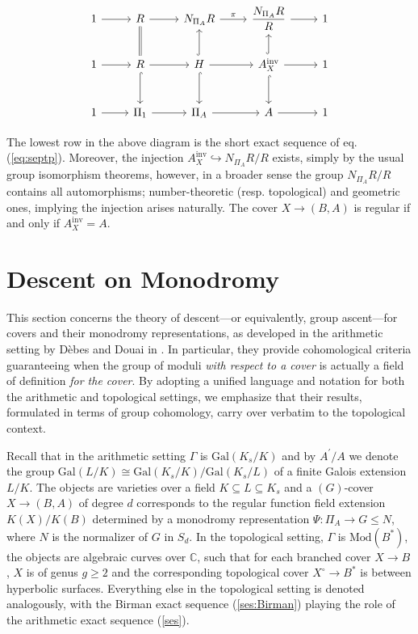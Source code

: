 \documentclass[10pt]{amsart}
\theoremstyle{definition}
\newcommand{\Gal}{{ \mathrm{Gal}}}
\begin{document}
\begin{equation}
\label{eq:defH-R}
\begin{tikzcd}[column sep=normal,row sep=normal]
1 \ar[r] & R \ar[r] & N_{\Pi_A}R \ar[r,"\pi"] & \dfrac{N_{\Pi_A}R}{R} \ar[r] & 1 \\
1 \ar[r] & R \ar[u, equal] \ar[r] \ar[hookrightarrow,d] & H \ar[r] \ar[hookrightarrow,u] \ar[hookrightarrow,d] & A_X^{\mathrm{inv}} \ar[r] \ar[hookrightarrow,u] \ar[hookrightarrow,d] & 1 \\[7.5pt]
1 \ar[r] & \Pi_1 \ar[r] & \Pi_A \ar[r] & A \ar[r] & 1
\end{tikzcd}
\end{equation}


The lowest row in the above diagram is the short exact sequence of eq. (\ref{eq:septp}). 
Moreover, the injection $A_X^{\mathrm{inv}} \hookrightarrow N_{\Pi_A}R/R$ exists, simply by the usual group isomorphism theorems, however, in a broader sense the group $N_{\Pi_A}R/R$ contains all automorphisms; number-theoretic (resp. topological) and geometric ones, implying the injection arises naturally.  The cover $X\rightarrow (B,A)$ is regular if and only if $A_X^{\mathrm{inv}} = A$.




\section{Descent on Monodromy}\label{ch:descend_on_monodromy}


This section concerns the theory of descent—or equivalently, group ascent—for covers and their monodromy representations, as developed in the arithmetic setting by Dèbes and Douai in \cite{DebesDouai97}. In particular, they provide cohomological criteria guaranteeing when the group of moduli {\em with respect to a cover} is actually a field of definition {\em for the cover}. By adopting a unified language and notation for both the arithmetic and topological settings, we emphasize that their results, formulated in terms of group cohomology, carry over verbatim to the topological context.

Recall that in the arithmetic setting $\mathfrak{\Gamma}$ is $\Gal(K_s/K)$ and by $A^\prime/A$ we denote the group $\Gal(L/K)\cong \Gal(K_s/K)/\Gal(K_s/L)$ of a finite Galois extension $L/K$. The objects are varieties over a field $K\subseteq L \subseteq K_s$ and a $(G)$-cover $X\rightarrow (B,A)$ of degree $d$ corresponds to the regular function field extension $K(X)/K(B)$ determined by a monodromy representation $\Psi\colon \Pi_A\rightarrow G\leq N$, where $N$ is the normalizer of $G$ in $S_d$. 
In the topological setting, $\mathfrak{\Gamma}$ is $\mathrm{Mod}(B^*)$, the objects are algebraic curves over $\mathbb{C}$, such that for each branched cover $X\rightarrow B$, $X$ is of genus $ g\geq 2$ and the corresponding topological cover $X^\circ \rightarrow B^*$ is between hyperbolic surfaces. Everything else in the topological setting is denoted analogously, with the Birman exact sequence (\ref{ses:Birman}) playing the role of the arithmetic exact sequence (\ref{ses}).
\end{document}
